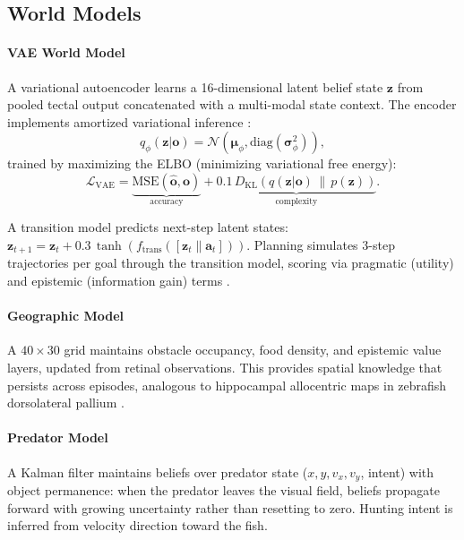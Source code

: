 \documentclass[12pt]{article}
\begin{document}
\subsection{World Models}\label{sec:world_models}

\paragraph{VAE World Model}

A variational autoencoder learns a 16-dimensional latent belief state
$\mathbf{z}$ from pooled tectal output concatenated with a
multi-modal state context.
The encoder implements amortized variational inference
\citep{kingma2014}:
\begin{equation}\label{eq:vae}
  q_\phi(\mathbf{z}|\mathbf{o}) = \mathcal{N}(\boldsymbol{\mu}_\phi,
    \text{diag}(\boldsymbol{\sigma}_\phi^2)),
\end{equation}
trained by maximizing the ELBO (minimizing variational free energy):
\begin{equation}\label{eq:elbo}
  \mathcal{L}_\text{VAE} =
    \underbrace{\text{MSE}(\hat{\mathbf{o}}, \mathbf{o})}_{\text{accuracy}}
    + \underbrace{0.1\,D_\text{KL}(q(\mathbf{z}|\mathbf{o})\,\|\,p(\mathbf{z}))}_{\text{complexity}}.
\end{equation}

A transition model predicts next-step latent states:
$\mathbf{z}_{t+1} = \mathbf{z}_t + 0.3\,\tanh(f_\text{trans}([\mathbf{z}_t \| \mathbf{a}_t]))$.
Planning simulates 3-step trajectories per goal through the transition
model, scoring via pragmatic (utility) and epistemic (information gain)
terms \citep{friston2017}.

\paragraph{Geographic Model}

A $40 \times 30$ grid maintains obstacle occupancy, food density,
and epistemic value layers, updated from retinal observations.
This provides spatial knowledge that persists across episodes,
analogous to hippocampal allocentric maps in zebrafish dorsolateral
pallium \citep{broglio2015}.

\paragraph{Predator Model}

A Kalman filter maintains beliefs over predator state
($x, y, v_x, v_y$, intent) with object permanence: when the predator
leaves the visual field, beliefs propagate forward with growing
uncertainty rather than resetting to zero.
Hunting intent is inferred from velocity direction toward the fish.
\end{document}
